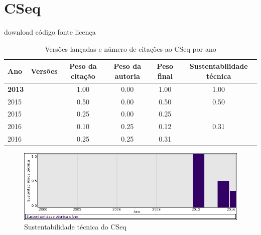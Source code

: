 \section{CSeq}
\checkmark download
\checkmark código fonte
\checkmark licença


\begin{table}[H]
\caption{Versões lançadas e número de citações ao CSeq por ano}
\centering
\begin{tabular}{| l | c | c | c | c | c |}
  \hline
  Ano & Versões & Peso da citação & Peso da autoria & Peso final & Sustentabilidade técnica \\
  \hline
            {\bf 2013}
          &
          
          &
          1.00
          &
          0.00
          &
          1.00
          &
            {\color{blue} 1.00}
          \\
\hline
            2015
          &
          
          &
          0.50
          &
          0.00
          &
          0.50
          &
            {\color{blue} 0.50}
          \\
            2015
          &
          
          &
          0.25
          &
          0.00
          &
          0.25
          &
          \\
\hline
            2016
          &
          
          &
          0.10
          &
          0.25
          &
          0.12
          &
            {\color{red} 0.31}
          \\
            2016
          &
          
          &
          0.25
          &
          0.25
          &
          0.31
          &
          \\
\hline
\end{tabular}
\end{table}

\begin{figure}[h]
  \center
  \includegraphics[scale=0.50]{imagens/softwares-charts/cseq.png}
  \caption{Sustentabilidade técnica do CSeq}
\end{figure}


